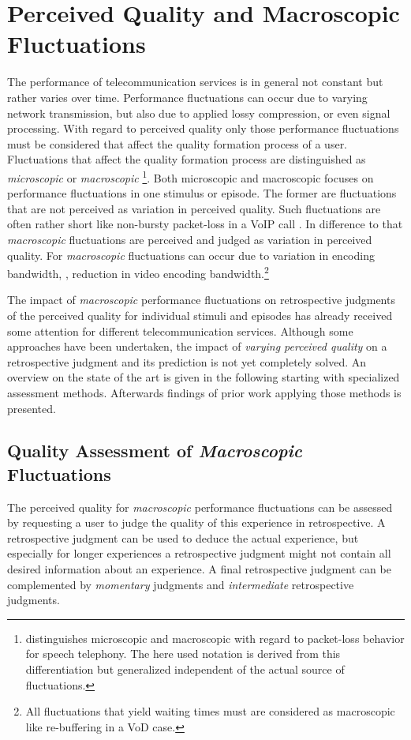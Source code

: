 \section{Perceived Quality and Macroscopic Fluctuations}\label{chap:04}
The performance of telecommunication services is in general not constant but rather varies over time.
Performance fluctuations can occur due to varying network transmission, but also due to applied lossy compression, or even signal processing.
With regard to perceived quality only those performance fluctuations must be considered that affect the quality formation process of a user.
Fluctuations that affect the quality formation process are distinguished as \emph{microscopic} or \emph{macroscopic} \citep[\cf,][p. 72]{raake_short-_2006}
\footnote{\citet{raake_short-_2006} distinguishes microscopic and macroscopic with regard to packet-loss behavior for speech telephony. The here used notation is derived from this differentiation but generalized independent of the actual source of fluctuations.}.
Both microscopic and macroscopic focuses on performance fluctuations in one stimulus or episode.
The former are fluctuations that are not perceived as variation in perceived quality.
Such fluctuations are often rather short like non-bursty packet-loss in a \ac{VoIP} call \citep[\cf,][p. 72]{raake_short-_2006}.
In difference to that \emph{macroscopic} fluctuations are perceived and judged as variation in perceived quality.
For \emph{macroscopic} fluctuations can occur due to variation in encoding bandwidth, \eg, reduction in video encoding bandwidth.\footnote{All fluctuations that yield waiting times must are considered as macroscopic like re-buffering in a \ac{VoD} case.}

The impact of \emph{macroscopic} performance fluctuations on retrospective judgments of the perceived quality for individual stimuli and episodes has already received some attention for different telecommunication services.
Although some approaches have been undertaken, the impact of \emph{varying perceived quality} on a retrospective judgment and its prediction is not yet completely solved.
An overview on the state of the art is given in the following starting with specialized assessment methods.
Afterwards findings of prior work applying those methods is presented.

\subsection{Quality Assessment of \emph{Macroscopic} Fluctuations}
The perceived quality for \emph{macroscopic} performance fluctuations can be assessed by requesting a user to judge the quality of this experience in retrospective.
A retrospective judgment can be used to deduce the actual experience, but especially for longer experiences a retrospective judgment might not contain all desired information about an experience.
A final retrospective judgment can be complemented by \emph{momentary} judgments and \emph{intermediate} retrospective judgments.


